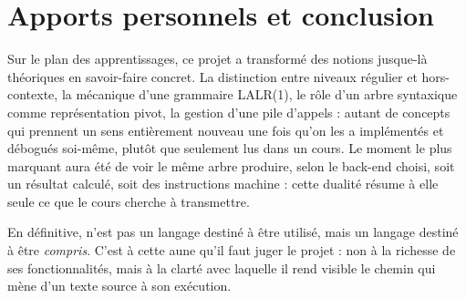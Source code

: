 \section{Apports personnels et conclusion}

Sur le plan des apprentissages, ce projet a transformé des notions jusque-là
théoriques en savoir-faire concret. La distinction entre niveaux régulier et
hors-contexte, la mécanique d'une grammaire LALR(1), le rôle d'un arbre syntaxique
comme représentation pivot, la gestion d'une pile d'appels : autant de concepts
qui prennent un sens entièrement nouveau une fois qu'on les a implémentés et
débogués soi-même, plutôt que seulement lus dans un cours. Le moment le plus marquant aura été de voir le même arbre produire,
selon le back-end choisi, soit un résultat calculé, soit des instructions
machine : cette dualité résume à elle seule ce que le cours cherche à transmettre.

En définitive, \ilang{} n'est pas un langage destiné à être utilisé, mais un
langage destiné à être \emph{compris}. C'est à cette aune qu'il faut juger le
projet : non à la richesse de ses fonctionnalités, mais à la clarté avec laquelle
il rend visible le chemin qui mène d'un texte source à son exécution.
